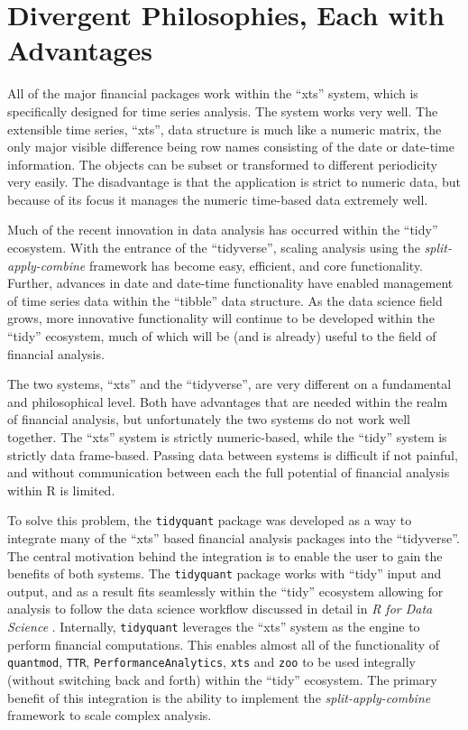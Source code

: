 \section{Divergent Philosophies, Each with
Advantages}\label{divergent-philosophies-each-with-advantages}

All of the major financial packages work within the ``xts'' system,
which is specifically designed for time series analysis. The system
works very well. The extensible time series, ``xts'', data structure is
much like a numeric matrix, the only major visible difference being row
names consisting of the date or date-time information. The objects can
be subset or transformed to different periodicity very easily. The
disadvantage is that the application is strict to numeric data, but
because of its focus it manages the numeric time-based data extremely
well.

Much of the recent innovation in data analysis has occurred within the
``tidy'' ecosystem. With the entrance of the ``tidyverse'', scaling
analysis using the \emph{split-apply-combine} framework has become easy,
efficient, and core functionality. Further, advances in date and
date-time functionality have enabled management of time series data
within the ``tibble'' data structure. As the data science field grows,
more innovative functionality will continue to be developed within the
``tidy'' ecosystem, much of which will be (and is already) useful to the
field of financial analysis.

The two systems, ``xts'' and the ``tidyverse'', are very different on a
fundamental and philosophical level. Both have advantages that are
needed within the realm of financial analysis, but unfortunately the two
systems do not work well together. The ``xts'' system is strictly
numeric-based, while the ``tidy'' system is strictly data frame-based.
Passing data between systems is difficult if not painful, and without
communication between each the full potential of financial analysis
within R is limited.

To solve this problem, the \texttt{tidyquant} package was developed as a
way to integrate many of the ``xts'' based financial analysis packages
into the ``tidyverse''. The central motivation behind the integration is
to enable the user to gain the benefits of both systems. The
\texttt{tidyquant} package works with ``tidy'' input and output, and as
a result fits seamlessly within the ``tidy'' ecosystem allowing for
analysis to follow the data science workflow discussed in detail in
\emph{R for Data Science} \citep{R4DS2017}. Internally,
\texttt{tidyquant} leverages the ``xts'' system as the engine to perform
financial computations. This enables almost all of the functionality of
\texttt{quantmod}, \texttt{TTR}, \texttt{PerformanceAnalytics},
\texttt{xts} and \texttt{zoo} to be used integrally (without switching
back and forth) within the ``tidy'' ecosystem. The primary benefit of
this integration is the ability to implement the
\emph{split-apply-combine} framework to scale complex analysis.

